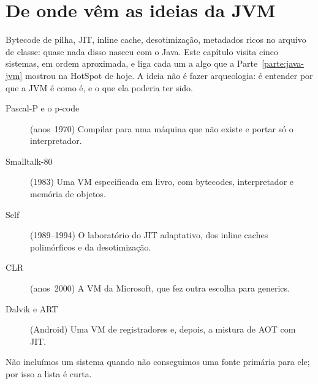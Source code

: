 \chapter{De onde vêm as ideias da JVM}
\label{cap:historia-vms}

\proximasaulas

Bytecode de pilha, JIT, inline cache, desotimização, metadados ricos no
arquivo de classe: quase nada disso nasceu com o Java. Este capítulo
visita cinco sistemas, em ordem aproximada, e liga cada um a algo que a
Parte~\ref{parte:java-jvm} mostrou na HotSpot de hoje. A ideia não é fazer arqueologia: é
entender por que a JVM é como é, e o que ela poderia ter sido.

\begin{description}
\item[Pascal-P e o p-code] (anos~1970) Compilar para uma máquina que não
  existe e portar só o interpretador.
\item[Smalltalk-80] (1983) Uma VM especificada em livro, com bytecodes,
  interpretador e memória de objetos.
\item[Self] (1989--1994) O laboratório do JIT adaptativo, dos inline
  caches polimórficos e da desotimização.
\item[CLR] (anos~2000) A VM da Microsoft, que fez outra escolha para
  generics.
\item[Dalvik e ART] (Android) Uma VM de registradores e, depois, a mistura
  de AOT com JIT.
\end{description}

Não incluímos um sistema quando não conseguimos uma fonte primária para
ele; por isso a lista é curta.








